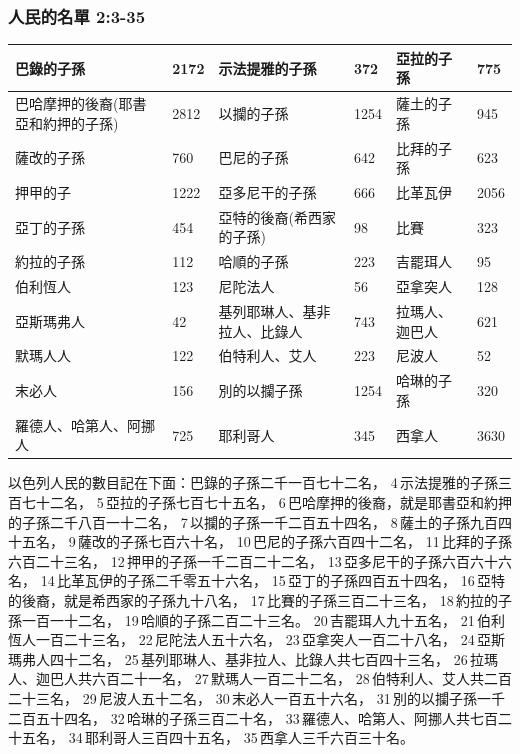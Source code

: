 \subsubsection{人民的名單 2:3-35}
\begin{table}[H]
\centering 
\begin{tabular}{|p{4cm}|p{1cm}|p{3cm}|p{1cm}|p{3cm}|p{1cm}|}\hline\hline
巴錄的子孫&2172 &示法提雅的子孫&372 &亞拉的子孫&775\\\hline
 巴哈摩押的後裔(耶書亞和約押的子孫)&2812&以攔的子孫  &1254&薩土的子孫&945\\\hline
薩改的子孫    &760&巴尼的子孫&642  &比拜的子孫  &623 \\\hline
押甲的子    &1222&亞多尼干的子孫&666  &比革瓦伊  &2056 \\\hline
亞丁的子孫    &454&亞特的後裔(希西家的子孫)&98  &比賽  &323 \\\hline
約拉的子孫    &112&哈順的子孫&223  &吉罷珥人  &95 \\\hline
伯利恆人    &123& 尼陀法人&56  &亞拿突人  &128 \\\hline
亞斯瑪弗人    &42&基列耶琳人、基非拉人、比錄人&743  &拉瑪人、迦巴人  &621 \\\hline
默瑪人人    &122& 伯特利人、艾人&223  &尼波人  &52 \\\hline
末必人    &156& 別的以攔子孫&1254  &哈琳的子孫  &320 \\\hline
羅德人、哈第人、阿挪人    &725&  耶利哥人&345  &西拿人  &3630 \\\hline
\end{tabular}
\end{table}
以色列人民的數目記在下面：巴錄的子孫二千一百七十二名， 4 示法提雅的子孫三百七十二名， 5 亞拉的子孫七百七十五名， 6 巴哈摩押的後裔，就是耶書亞和約押的子孫二千八百一十二名， 7 以攔的子孫一千二百五十四名， 8 薩土的子孫九百四十五名， 9 薩改的子孫七百六十名， 10 巴尼的子孫六百四十二名， 11 比拜的子孫六百二十三名， 12 押甲的子孫一千二百二十二名， 13 亞多尼干的子孫六百六十六名， 14 比革瓦伊的子孫二千零五十六名， 15 亞丁的子孫四百五十四名， 16 亞特的後裔，就是希西家的子孫九十八名， 17 比賽的子孫三百二十三名， 18 約拉的子孫一百一十二名， 19 哈順的子孫二百二十三名。 20 吉罷珥人九十五名， 21 伯利恆人一百二十三名， 22 尼陀法人五十六名， 23 亞拿突人一百二十八名， 24 亞斯瑪弗人四十二名， 25 基列耶琳人、基非拉人、比錄人共七百四十三名， 26 拉瑪人、迦巴人共六百二十一名， 27 默瑪人一百二十二名， 28 伯特利人、艾人共二百二十三名， 29 尼波人五十二名， 30 末必人一百五十六名， 31 別的以攔子孫一千二百五十四名， 32 哈琳的子孫三百二十名， 33 羅德人、哈第人、阿挪人共七百二十五名， 34 耶利哥人三百四十五名， 35 西拿人三千六百三十名。

